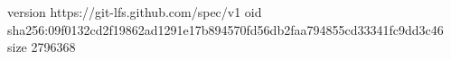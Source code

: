 version https://git-lfs.github.com/spec/v1
oid sha256:09f0132cd2f19862ad1291e17b894570fd56db2faa794855cd33341fc9dd3c46
size 2796368

